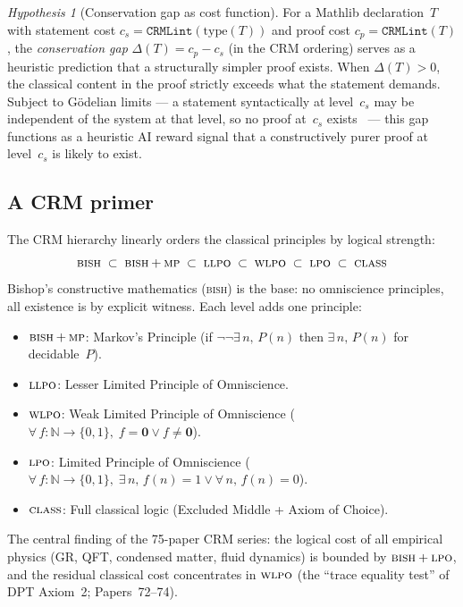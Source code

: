 \documentclass[12pt, a4paper]{article}
\theoremstyle{plain}
\theoremstyle{definition}
\theoremstyle{remark}
\newtheorem{hypothesis}[theorem]{Hypothesis}
\newcommand{\BISH}{\textsc{bish}}
\newcommand{\BISHMP}{\textsc{bish\,+\,mp}}
\newcommand{\LLPO}{\textsc{llpo}}
\newcommand{\WLPO}{\textsc{wlpo}}
\newcommand{\LPO}{\textsc{lpo}}
\newcommand{\CLASS}{\textsc{class}}
\newcommand{\CRMLint}{\texttt{CRMLint}}
\begin{document}
\begin{hypothesis}[Conservation gap as cost function]\label{hyp:C}
  For a Mathlib declaration~$T$ with statement cost
  $c_s = \CRMLint(\mathrm{type}(T))$ and proof cost
  $c_p = \CRMLint(T)$, the \emph{conservation gap}
  $\Delta(T) = c_p - c_s$ (in the CRM ordering) serves as a
  heuristic prediction that a structurally simpler proof exists.
  When $\Delta(T) > 0$, the classical content in the proof
  strictly exceeds what the statement demands.  Subject to
  G\"odelian limits --- a statement syntactically at level~$c_s$
  may be independent of the system at that level, so no proof
  at~$c_s$ exists~\cite{paris-harrington} --- this gap functions
  as a heuristic AI reward signal that a constructively purer
  proof at level~$c_s$ is likely to exist.
\end{hypothesis}

\subsection{A CRM primer}

The CRM hierarchy linearly orders the classical principles
by logical strength:
\[
\BISH \;\subset\; \BISHMP \;\subset\; \LLPO \;\subset\; \WLPO \;\subset\; \LPO \;\subset\; \CLASS
\]
Bishop's constructive mathematics (\BISH) is the base: no
omniscience principles, all existence is by explicit witness.
Each level adds one principle:
\begin{itemize}[nosep]
  \item $\BISHMP$: Markov's Principle (if $\lnot\lnot\exists\,n,\,P(n)$ then $\exists\,n,\,P(n)$ for decidable~$P$).
  \item $\LLPO$: Lesser Limited Principle of Omniscience.
  \item $\WLPO$: Weak Limited Principle of Omniscience ($\forall\,f : \mathbb{N} \to \{0,1\},\; f = \mathbf{0} \lor f \neq \mathbf{0}$).
  \item $\LPO$: Limited Principle of Omniscience ($\forall\,f : \mathbb{N} \to \{0,1\},\; \exists\,n,\,f(n) = 1 \lor \forall\,n,\,f(n) = 0$).
  \item $\CLASS$: Full classical logic (Excluded Middle + Axiom of Choice).
\end{itemize}
The central finding of the 75-paper CRM series: the logical cost of
all empirical physics (GR, QFT, condensed matter, fluid dynamics)
is bounded by $\BISH + \LPO$, and the residual classical cost
concentrates in $\WLPO$ (the ``trace equality test'' of DPT
Axiom~2; Papers~72--74).
\end{document}
